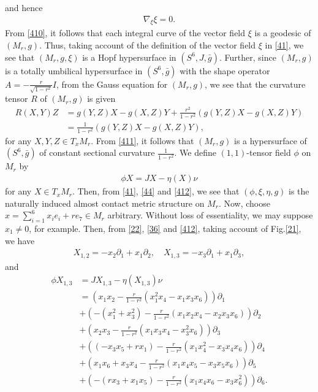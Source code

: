 \documentclass[12pt]{article}
\numberwithin{equation}{section}
\begin{document}
and hence
\begin{equation}\label{410}
\begin{split}
{\nabla}_{\xi}\xi=0.
\end{split}
\end{equation}
From \eqref{410}, it follows that each integral curve of the vector
field $\xi$ is a geodesic of $(M_{r}, g)$. Thus, taking account of the
definition of the vector field $\xi$ in \eqref{41}, we see that
$(M_{r}, g, \xi)$ is a Hopf hypersurface in $(S^6, J, \bar{g})$.
Further, since $(M_{r}, g)$ is a totally umbilical hypersurface in
$(S^6, \bar{g})$ with the shape operator
$A=-\frac{r}{\sqrt{1-r^2}}I$, from the Gauss equation for $(M_{r},
g)$, we see that the curvature tensor $R$ of $(M_{r}, g)$ is given
\begin{equation}\label{411}
\begin{split}
R(X, Y)Z&=g(Y, Z)X-g(X, Z)Y+\frac{r^2}{1-r^2}(g(Y, Z)X-g(X, Z)Y)\\
&=\frac{1}{1-r^2}(g(Y, Z)X-g(X, Z)Y),
\end{split}
\end{equation}
for any $X, Y, Z \in {T_{x}M_{r}}$. From \eqref{411}, it follows that
$(M_{r}, g)$ is a hypersurface of $(S^6, \bar{g})$ of constant
sectional curvature $\frac{1}{1-r^2}$. We define $(1,1)$-tensor
field $\phi$ on $M_{r}$ by
\begin{equation}\label{412}
\begin{split}
\phi X=JX-\eta (X)\nu
\end{split}
\end{equation}
for any $X \in {T_{x}M_{r}}$. Then, from \eqref{41},
\eqref{44} and \eqref{412}, we see that $(\phi, \xi, \eta, g)$ is
the naturally induced almost contact metric structure on $M_{r}$. Now,
choose $x=\sum_{i=1}^6 x_ie_i+re_7 \in M_{r}$ arbitrary.
Without loss of essentiality, we may suppose $x_1\neq 0$, for example.
Then, from \eqref{22}, \eqref{36} and \eqref{412}, taking account of Fig.\eqref{21}, we
have
\begin{equation}\label{413}
\begin{split}
X_{1, 2}=-x_2\partial_1+x_1\partial_2, \quad X_{1,
3}=-x_3\partial_1+x_1\partial_3,
\end{split}
\end{equation}
and
\begin{equation}\label{414}
\begin{split}
\phi X_{1, 3}&=JX_{1, 3}-\eta(X_{1, 3})\nu\\
&=(x_1x_2-\frac{r}{1-r^2}(x_1^2x_4-x_1x_3x_6))\partial_1\\
&+(-(x_1^2+x_3^2)-\frac{r}{1-r^2}(x_1x_2x_4-x_2x_3x_6))\partial_2\\
&+(x_2x_3-\frac{r}{1-r^2}(x_1x_3x_4-x_3^2x_6))\partial_3\\
&+((-x_3x_5+rx_1)-\frac{r}{1-r^2}(x_1x_4^2-x_3x_4x_6))\partial_4\\
&+(x_1x_6+x_3x_4-\frac{r}{1-r^2}(x_1x_4x_5-x_3x_5x_6))\partial_5\\
&+(-(rx_3+x_1x_5)-\frac{r}{1-r^2}(x_1x_4x_6-x_3x_6^2))\partial_6.
\end{split}
\end{equation}
\end{document}
